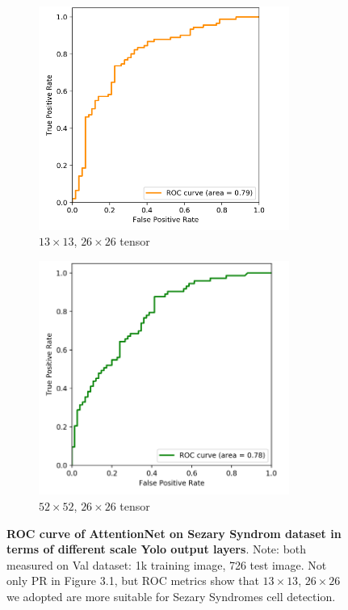 \begin{figure}[h]
	\begin{center}
		\begin{subfigure}[b]{0.49\textwidth}
			\includegraphics[width=0.9\textwidth]{thesis-template-master/images/2 tensor cellyolo ROC.png}
			\caption{$13 \times 13$, $26 \times 26$ tensor  }
			\label{fig:res18}
		\end{subfigure}
		\begin{subfigure}[b]{0.49\textwidth}
		    \centering
			\includegraphics[width=0.9\textwidth]{thesis-template-master/images/52 tensor cellyolo ROC.png}
			\caption{$52 \times 52$, $26 \times 26$ tensor  }
			\label{fig:cellnet}
		\end{subfigure}
	\end{center}
	\caption{\textbf{ROC curve of AttentionNet on Sezary Syndrom dataset in terms of different scale Yolo output layers}. Note: both measured on Val dataset: 1k training image, 726 test image. Not only PR in Figure 3.1, but ROC metrics show that $13\times13$, $26\times26$ we adopted are more suitable for Sezary Syndromes cell detection.}
\end{figure}

